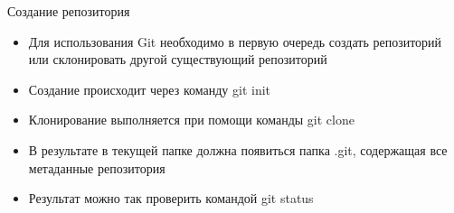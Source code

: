 \begin{frame}{Создание репозитория}
    \begin{itemize}
        \item
              Для использования Git необходимо в первую очередь создать репозиторий или склонировать другой существующий репозиторий
        \item
              Создание происходит через команду git init
        \item
              Клонирование выполняется при помощи команды git clone
        \item
              В результате в текущей папке должна появиться папка .git, содержащая все метаданные репозитория
        \item
              Результат можно так проверить командой git status
    \end{itemize}
\end{frame}